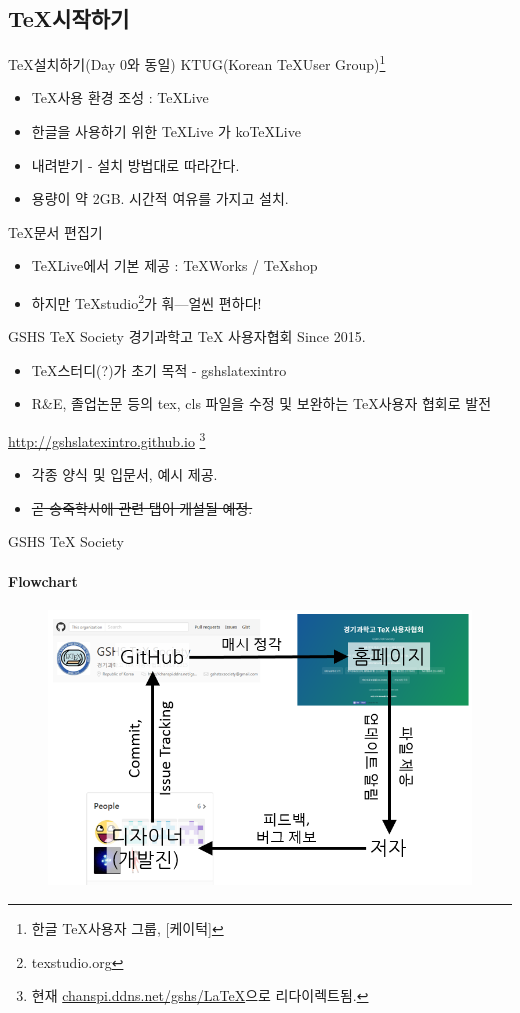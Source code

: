 \documentclass[12pt]{beamer}
\begin{document}
\subsection{\TeX 시작하기}
\begin{frame}{\TeX 설치하기(Day 0와 동일)}
	KTUG(Korean \TeX User Group)\footnote{한글 \TeX 사용자 그룹, [케이턱]}
	\begin{itemize}
		\item \TeX 사용 환경 조성 : TeXLive
		\item 한글을 사용하기 위한 TeXLive 가 koTeXLive
		\item 내려받기 - 설치 방법대로 따라간다.
		\item 용량이 약 2GB. 시간적 여유를 가지고 설치.
	\end{itemize}
	\TeX 문서 편집기
	\begin{itemize}
		\item TeXLive에서 기본 제공 : TeXWorks / TeXshop
		\item 하지만 TeXstudio\footnote{texstudio.org}가 훠---얼씬 
		편하다!
	\end{itemize}
\end{frame}
\begin{frame}{GSHS TeX Society}
	경기과학고 TeX 사용자협회 Since 2015.
	\begin{itemize}
		\item \TeX 스터디(?)가 초기 목적 - gshslatexintro
		\item R\&E, 졸업논문 등의 tex, cls 파일을 수정 및 보완하는 \TeX 사용자 협회로 발전
	\end{itemize}
	\url{http://gshslatexintro.github.io} \footnote{현재 \url{chanspi.ddns.net/gshs/LaTeX}으로 리다이렉트됨.}
	\begin{itemize}
		\item 각종 양식 및 입문서, 예시 제공.
		\item \sout{곧 송죽학사에 관련 탭이 개설될 예정.}
	\end{itemize}
\end{frame}
\begin{frame}{GSHS TeX Society}
	\framesubtitle{Flowchart}
	\begin{figure}[h]
		\centering
		\includegraphics[width=\textwidth]{gshstexsociety.png}
	\end{figure}
\end{frame}
\end{document}
